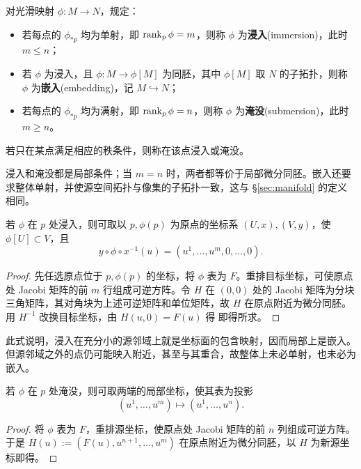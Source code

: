 \begin{definition}
    对光滑映射 $\phi:M\to N$，规定：
    \begin{itemize}
        \item 若每点的 $\phi_{*p}$ 均为单射，即 $\rank_p\phi=m$，则称 $\phi$ 为\textbf{浸入}(immersion)，此时 $m\leqslant n$；
        \item 若 $\phi$ 为浸入，且 $\phi:M\to\phi[M]$ 为同胚，其中 $\phi[M]$ 取 $N$ 的子拓扑，则称 $\phi$ 为\textbf{嵌入}(embedding)，记 $M\hookrightarrow N$；
        \item 若每点的 $\phi_{*p}$ 均为满射，即 $\rank_p\phi=n$，则称 $\phi$ 为\textbf{淹没}(submersion)，此时 $m\geqslant n$。
    \end{itemize}
    若只在某点满足相应的秩条件，则称在该点浸入或淹没。
\end{definition}

浸入和淹没都是局部条件；当 $m=n$ 时，两者都等价于局部微分同胚。嵌入还要求整体单射，并使源空间拓扑与像集的子拓扑一致，这与 \S\ref{sec:manifold} 的定义相同。

\begin{theorem}[浸入的局部标准形]\label{chdm:thm_immerse-1}
    若 $\phi$ 在 $p$ 处浸入，则可取以 $p,\phi(p)$ 为原点的坐标系 $(U,x),(V,y)$，使 $\phi[U]\subset V$，且
    \[
        y\circ\phi\circ x^{-1}(u)=(u^1,\ldots,u^m,0,\ldots,0).
    \]
\end{theorem}
\begin{proof}
    先任选原点位于 $p,\phi(p)$ 的坐标，将 $\phi$ 表为 $F$。重排目标坐标，可使原点处 Jacobi 矩阵的前 $m$ 行组成可逆方阵。令
    $H$ 在 $(0,0)$ 处的 Jacobi 矩阵为分块三角矩阵，其对角块为上述可逆矩阵和单位矩阵，故 $H$ 在原点附近为微分同胚。用 $H^{-1}$ 改换目标坐标，由 $H(u,0)=F(u)$ 得
    即得所求。
\end{proof}

此式说明，浸入在充分小的源邻域上就是坐标面的包含映射，因而局部上是嵌入。但源邻域之外的点仍可能映入附近，甚至与其重合，故整体上未必单射，也未必为嵌入。

\begin{theorem}[淹没的局部标准形]
    若 $\phi$ 在 $p$ 处淹没，则可取两端的局部坐标，使其表为投影
    \[
        (u^1,\ldots,u^m)\longmapsto(u^1,\ldots,u^n).
    \]
\end{theorem}
\begin{proof}
    将 $\phi$ 表为 $F$，重排源坐标，使原点处 Jacobi 矩阵的前 $n$ 列组成可逆方阵。于是 $H(u):=(F(u),u^{n+1},\ldots,u^m)$ 在原点附近为微分同胚，以 $H$ 为新源坐标即得。
\end{proof}

